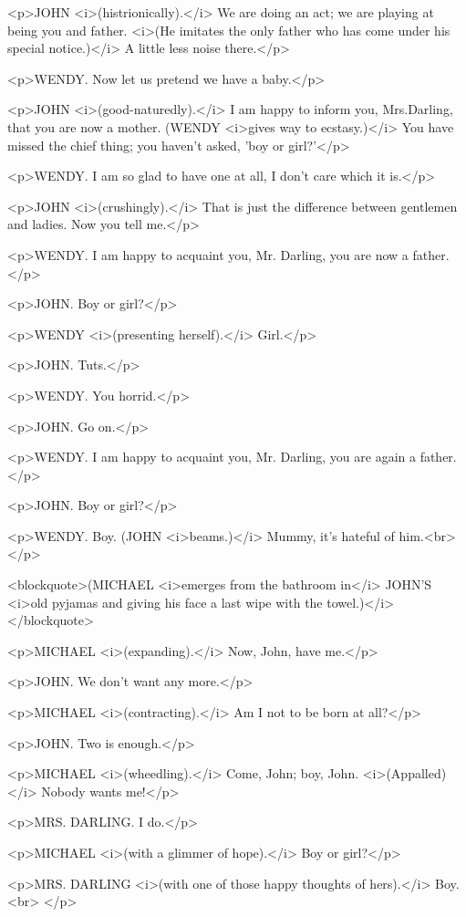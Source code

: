 <p>JOHN <i>(histrionically).</i> We are doing an act; we are playing
at being you and father. <i>(He imitates the only father who has come
under his special notice.)</i> A little less noise there.</p>

<p>WENDY. Now let us pretend we have a baby.</p>

<p>JOHN <i>(good-naturedly).</i> I am happy to inform you,
Mrs.Darling, that you are now a mother. (WENDY <i>gives way to
ecstasy.)</i> You have missed the chief thing; you haven't asked,
'boy or girl?'</p>

<p>WENDY. I am so glad to have one at all, I don't care which it
is.</p>

<p>JOHN <i>(crushingly).</i> That is just the difference between
gentlemen and ladies. Now you tell me.</p>

<p>WENDY. I am happy to acquaint you, Mr. Darling, you are now a
father.</p>

<p>JOHN. Boy or girl?</p>

<p>WENDY <i>(presenting herself).</i> Girl.</p>

<p>JOHN. Tuts.</p>

<p>WENDY. You horrid.</p>

<p>JOHN. Go on.</p>

<p>WENDY. I am happy to acquaint you, Mr. Darling, you are again a
father.</p>

<p>JOHN. Boy or girl?</p>

<p>WENDY. Boy. (JOHN <i>beams.)</i> Mummy, it's hateful of him.<br>
</p>

<blockquote>(MICHAEL <i>emerges from the bathroom in</i> JOHN'S
<i>old pyjamas and giving his face a last wipe with the
towel.)</i></blockquote>

<p>MICHAEL <i>(expanding).</i> Now, John, have me.</p>

<p>JOHN. We don't want any more.</p>

<p>MICHAEL <i>(contracting).</i> Am I not to be born at all?</p>

<p>JOHN. Two is enough.</p>

<p>MICHAEL <i>(wheedling).</i> Come, John; boy, John.
<i>(Appalled)</i> Nobody wants me!</p>

<p>MRS. DARLING. I do.</p>

<p>MICHAEL <i>(with a glimmer of hope).</i> Boy or girl?</p>

<p>MRS. DARLING <i>(with one of those happy thoughts of hers).</i>
Boy.<br>
</p>

